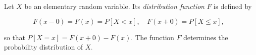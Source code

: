 Let $X$ be an elementary random variable. Its \textit{distribution function} $F$ is defined by

$$F(x-0) = F(x) = P[X < x], \quad F(x+0) = P[X \leq x],$$

so that $P[X = x] = F(x+0) - F(x)$. The function $F$ determines the probability distribution of $X$.
